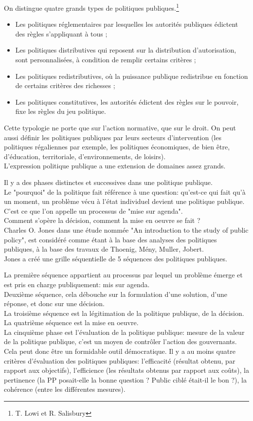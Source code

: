 \documentclass[10pt, a4paper, openany]{book}
\begin{document}
On distingue quatre grands types de politiques publiques.\footnote{T. Lowi et R. Salisbury}
\begin{itemize}
\item Les politiques réglementaires par lesquelles les autorités publiques édictent des règles s'appliquant à tous ;
\item Les politiques distributives qui reposent sur la distribution d'autorisation, sont personnalisées, à condition de remplir certains critères ;
\item Les politiques redistributives, où la puissance publique redistribue en fonction de certains critères des richesses ;
\item Les politiques constitutives, les autorités édictent des règles sur le pouvoir, fixe les règles du jeu politique. 
\end{itemize}


Cette typologie ne porte que sur l'action normative, que sur le droit. On peut aussi définir les politiques publiques par leurs secteurs d'intervention (les politiques régaliennes par exemple, les politiques économiques, de bien être, d'éducation, territoriale, d'environnements, de loisirs). \\
L'expression politique publique a une extension de domaines assez grands. 


Il y a des phases distinctes et successives dans une politique publique. \\
Le "pourquoi" de la politique fait référence à une question: qu'est-ce qui fait qu'à un moment, un problème vécu à l'état individuel devient une politique publique. C'est ce que l'on appelle un processus de "mise sur agenda". \\
Comment s'opère la décision, comment la mise en oeuvre se fait ? \\
Charles O. Jones dans une étude nommée "An introduction to the study of public policy", est considéré comme étant à la base des analyses des politiques publiques, à la base des travaux de Thoenig, Mény, Muller, Jobert. \\
Jones a créé une grille séquentielle de 5 séquences des politiques publiques.


La première séquence appartient au processus par lequel un problème émerge et est pris en charge publiquement: mis sur agenda. \\
Deuxième séquence, cela débouche sur la formulation d'une solution, d'une réponse, et donc sur une décision. \\
La troisième séquence est la légitimation de la politique publique, de la décision. \\
La quatrième séquence est la mise en oeuvre. \\
La cinquième phase est l'évaluation de la politique publique: mesure de la valeur de la politique publique, c'est un moyen de contrôler l'action des gouvernants. Cela peut donc être un formidable outil démocratique. Il y a au moins quatre critères d'évaluation des politiques publiques: l'efficacité (résultat obtenu, par rapport aux objectifs), l'efficience (les résultats obtenus par rapport aux coûts), la pertinence (la PP posait-elle la bonne question ? Public ciblé était-il le bon ?), la cohérence (entre les différentes mesures). 
\end{document}
